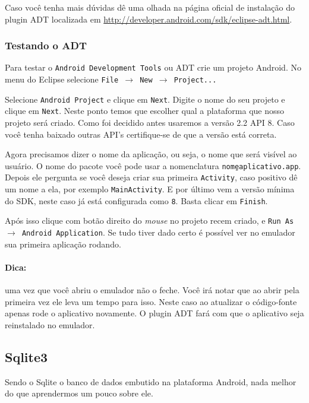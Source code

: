 Caso você tenha mais dúvidas dê uma olhada na página oficial de instalação do plugin ADT localizada em
\url{http://developer.android.com/sdk/eclipse-adt.html}.

\subsubsection{Testando o ADT \label{sssec:testando}}

Para testar o \texttt{Android Development Tools} ou ADT crie um projeto Android. No menu do Eclipse selecione
\texttt{File $\rightarrow$ New $\rightarrow$ Project...}

Selecione \texttt{Android Project} e clique em \texttt{Next}. Digite o nome do seu projeto e clique em
\texttt{Next}. Neste ponto temos que escolher qual a plataforma que nosso projeto será criado. Como foi
decidido antes usaremos a versão 2.2 API 8. Caso você tenha baixado outras API's certifique-se de que
a versão está correta.

Agora precisamos dizer o nome da aplicação, ou seja, o nome que será visível ao usuário. O nome do pacote
você pode usar a nomenclatura \texttt{nome\b{ }aplicativo.app}. Depois ele pergunta se você deseja
criar sua primeira \texttt{Activity}, caso positivo dê um nome a ela, por exemplo \texttt{MainActivity}.
E por último vem a versão mínima do SDK, neste caso já está configurada como \texttt{8}. Basta clicar
em \texttt{Finish}.

Após isso clique com botão direito do \textit{mouse} no projeto recem criado, e \texttt{Run As $\rightarrow$
Android Application}. Se tudo tiver dado certo é possível ver no emulador sua primeira aplicação
rodando.

\paragraph{Dica:} uma vez que você abriu o emulador não o feche. Você irá notar que ao abrir
pela primeira vez ele leva um tempo para isso. Neste caso ao atualizar o código-fonte apenas
rode o aplicativo novamente. O plugin ADT fará com que o aplicativo seja reinstalado no emulador.

\subsection{Sqlite3}

Sendo o Sqlite o banco de dados embutido na plataforma Android, nada melhor do que aprendermos um pouco
sobre ele.

